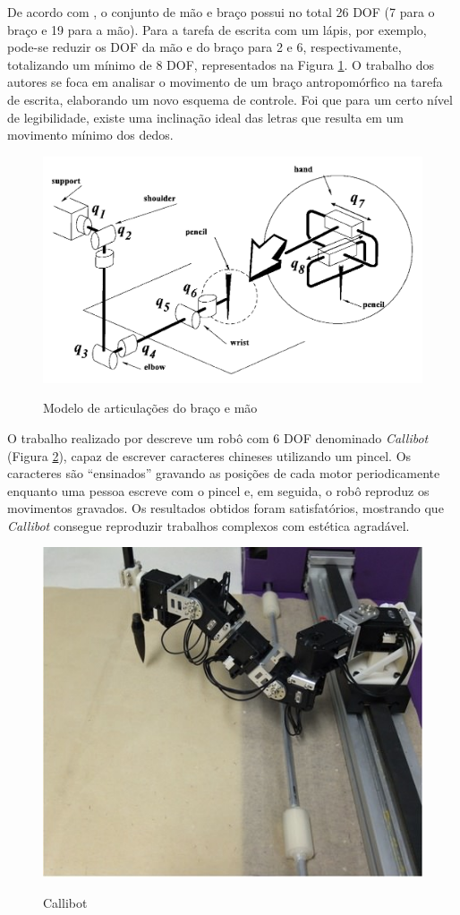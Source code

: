 De acordo com , o conjunto de mão e braço possui no total 26 \ac{DOF} (7 para o braço e 19 para a mão). Para a tarefa de escrita com um lápis, por exemplo, pode-se reduzir os \ac{DOF} da mão e do braço para 2 e 6, respectivamente, totalizando um mínimo de 8 \ac{DOF}, representados na Figura \ref{fig:dof}. O trabalho dos autores se foca em analisar o movimento de um braço antropomórfico na tarefa de escrita, elaborando um novo esquema de controle. Foi que para um certo nível de legibilidade, existe uma inclinação ideal das letras que resulta em um movimento mínimo dos dedos.

\begin{figure}[h]
  \setlength{\abovecaptionskip}{0pt}
  \setlength{\belowcaptionskip}{0pt}
  \caption[Modelo de articulações do braço e mão]{Modelo de articulações do braço e mão}
  \centering
  \includegraphics[width=.5\textwidth]{imagem/redundancy_dof}
  \captionsetup{justification=centering}
  \label{fig:dof}
\end{figure}

O trabalho realizado por  descreve um robô com 6 \ac{DOF} denominado \textit{Callibot} (Figura \ref{fig:callibot}), capaz de escrever caracteres chineses utilizando um pincel. Os caracteres são ``ensinados'' gravando as posições de cada motor periodicamente enquanto uma pessoa escreve com o pincel e, em seguida, o robô reproduz os movimentos gravados. Os resultados obtidos foram satisfatórios, mostrando que \textit{Callibot} consegue reproduzir trabalhos complexos com estética agradável.

\begin{figure}[H]
  \setlength{\abovecaptionskip}{0pt}
  \setlength{\belowcaptionskip}{0pt}
  \caption[Callibot]{Callibot}
  \centering
  \includegraphics[width=.5\textwidth]{imagem/callibot}
  \captionsetup{justification=centering}
  \label{fig:callibot}
\end{figure}

